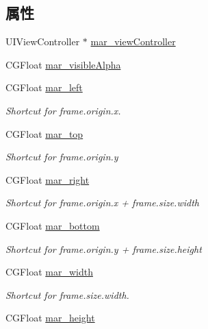 \subsection*{属性}
\begin{DoxyCompactItemize}
\item 
U\+I\+View\+Controller $\ast$ \hyperlink{category_u_i_view_07_m_a_r_e_x_08_a0a009a030cda1d994f17a061d39cde95}{mar\+\_\+view\+Controller}
\item 
C\+G\+Float \hyperlink{category_u_i_view_07_m_a_r_e_x_08_a8622083270bf5c6a3351a77ad6a218cf}{mar\+\_\+visible\+Alpha}
\item 
C\+G\+Float \hyperlink{category_u_i_view_07_m_a_r_e_x_08_a684b58d463170fed6c66f4810554b96e}{mar\+\_\+left}
\begin{DoxyCompactList}\small\item\em Shortcut for frame.\+origin.\+x. \end{DoxyCompactList}\item 
C\+G\+Float \hyperlink{category_u_i_view_07_m_a_r_e_x_08_a19899ccee7ad379c7b63af7452079e6a}{mar\+\_\+top}
\begin{DoxyCompactList}\small\item\em Shortcut for frame.\+origin.\+y \end{DoxyCompactList}\item 
C\+G\+Float \hyperlink{category_u_i_view_07_m_a_r_e_x_08_a9c6306ebc9046cac04a2f04ff09e93ad}{mar\+\_\+right}
\begin{DoxyCompactList}\small\item\em Shortcut for frame.\+origin.\+x + frame.\+size.\+width \end{DoxyCompactList}\item 
C\+G\+Float \hyperlink{category_u_i_view_07_m_a_r_e_x_08_ad5d081bca51837d2ef4d13ca0bbcff9a}{mar\+\_\+bottom}
\begin{DoxyCompactList}\small\item\em Shortcut for frame.\+origin.\+y + frame.\+size.\+height \end{DoxyCompactList}\item 
C\+G\+Float \hyperlink{category_u_i_view_07_m_a_r_e_x_08_a4a35f13e5de8a71d3c544cda71698b7a}{mar\+\_\+width}
\begin{DoxyCompactList}\small\item\em Shortcut for frame.\+size.\+width. \end{DoxyCompactList}\item 
C\+G\+Float \hyperlink{category_u_i_view_07_m_a_r_e_x_08_ac6cca2bffb961cc19266fda1a740e1fe}{mar\+\_\+height}

\end{DoxyCompactItemize}
